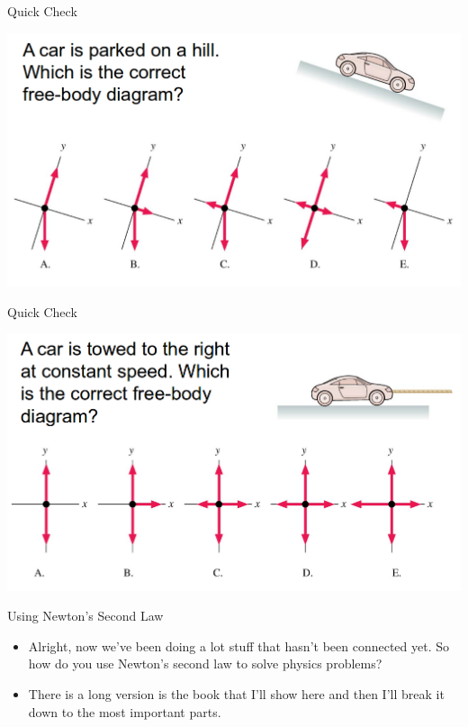 \documentclass{beamer}
\newcommand{\red}[1]{{\color{red}{#1}}}
\newcommand{\checkL}[2]{\begin{textblock*}{1cm}(#1,#2){\Large \red{\Checkmark}}\end{textblock*}}
\begin{document}
\begin{frame}{Quick Check}
\begin{center}
   \includegraphics[width=\textwidth]{../figures/QC6_3.png}
\end{center}
\only<2>{\checkL{6.0cm}{7.2cm}}
\end{frame}

\begin{frame}{Quick Check}
\begin{center}
   \includegraphics[width=\textwidth]{../figures/QC6_4.png}
\end{center}
\only<2>{\checkL{8.0cm}{7.2cm}}
\end{frame}

\begin{frame}{Using Newton's Second Law}
\begin{itemize}
   \item Alright, now we've been doing a lot stuff that hasn't been connected yet. So how do you use Newton's second law to solve physics problems?
   \item There is a long version is the book that I'll show here and then I'll break it down to the most important parts.
\end{itemize}
\end{frame}
\end{document}
